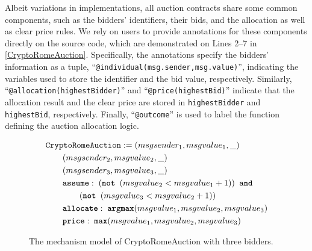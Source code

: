 Albeit variations in implementations, all auction contracts share some common components, such as
the bidders' identifiers, their bids, and the allocation as well as clear price rules.
We rely on users to provide annotations for these components directly on the source code, which are
demonstrated on Lines 2--7 in \cref{CryptoRomeAuction}.
Specifically, the annotations specify the bidders' information as a tuple,
``\texttt{@individual(msg.sender,msg.value)}'', indicating the variables used to store the
identifier and the bid value, respectively.
Similarly, ``\texttt{@allocation(highestBidder)}'' and ``\texttt{@price(highestBid)}'' indicate
that the allocation result and the clear price are stored in \texttt{highestBidder} and
\texttt{highestBid}, respectively.
Finally, ``\texttt{@outcome}'' is used to label the function defining the auction allocation logic.

\begin{figure}[t]
	\small
	\begin{align*}
		& \texttt{CryptoRomeAuction} := (msgsender_1, msgvalue_1, \_ ) \\
		& \qquad (msgsender_2, msgvalue_2, \_ ) \\
		& \qquad (msgsender_3, msgvalue_3, \_ ) \\
		& \qquad \texttt{\textbf{assume}}:\; (\texttt{\textbf{not }} (msgvalue_2 < msgvalue_1 + 1)) \texttt{\textbf{ and }} \\
		& \qquad\qquad (\texttt{\textbf{not }} (msgvalue_3 < msgvalue_2 + 1)) \\
		& \qquad \texttt{\textbf{allocate}}:\; \texttt{\textbf{argmax}}(msgvalue_1,
		msgvalue_2, msgvalue_3)\\
		& \qquad \texttt{\textbf{price}}:\; \texttt{\textbf{max}}(msgvalue_1, msgvalue_2,
		msgvalue_3)
	\end{align*}%
	\caption{The mechanism model of CryptoRomeAuction with three bidders.}\label{Crypto_Mechanism}
\end{figure}

